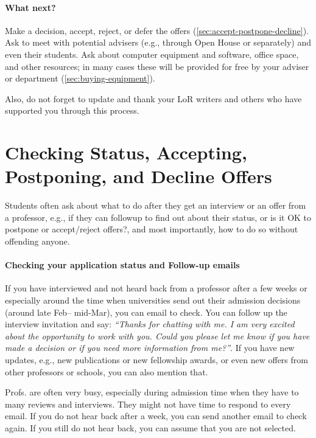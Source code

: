\documentclass[oneside,11pt,dvipsnames]{book}
\begin{document}
\paragraph{What next?} Make a decision, accept, reject, or defer the offers  (\autoref{sec:accept-postpone-decline}). Ask to meet with potential advisers (e.g., through Open House or separately) and even their students. Ask about computer equipment and software, office space, and other resources; in many cases these will be provided for free by your adviser or department (\autoref{sec:buying-equipment}).

Also, do not forget to update and thank your LoR writers and others who have supported you through this process.


\section{Checking Status, Accepting, Postponing, and Decline Offers}\label{sec:accept-postpone-decline}

Students often ask about what to do after they get an interview or an offer from a professor, e.g., if they can followup to find out about their status, or is it OK to postpone or accept/reject offers?, and most importantly, how to do so without offending anyone. 

\paragraph{Checking your application status and Follow-up emails} If you have interviewed and not heard back from a professor after a few weeks or especially around the time when universities send out their admission decisions (around late Feb-- mid-Mar), you can email to check.  You can follow up the interview invitation and say: \emph{``Thanks for chatting with me. I am very excited about the opportunity to work with you.  Could you please let me know if you have made a decision or if you need more information from me?''}.  If you have new updates, e.g., new publications or new fellowship awards, or even new offers from other professors or schools, you can also mention that.

Profs. are often very busy, especially during admission time when they have to many reviews and interviews.  They might not have time to respond to every email.  If you do not hear back after a week, you can send another email to check again.  If you still do not hear back, you can assume that you are not selected.
\end{document}
